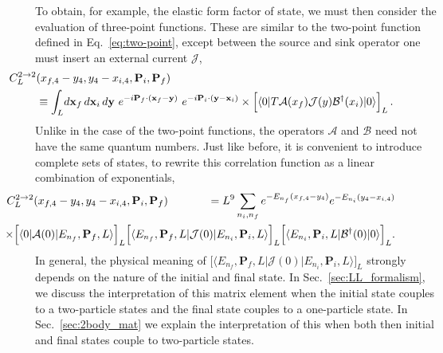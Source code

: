 \documentclass{iopart}
\theoremstyle{definition}
\newcommand{\nn}{\nonumber}
\begin{document}
{To obtain, for example, the elastic form factor of state, we must then consider the evaluation of three-point functions. These are similar to the two-point function defined in Eq.~\ref{eq:two-point}, except between the source and sink operator one must insert an external current $\mathcal{J}$, 
\begin{eqnarray}
\hspace{-2.2cm}
C_L^{2\rightarrow 2}(x_{f,4}-y_{4},y_{4}-x_{i,4}, \mathbf P_i, \mathbf P_f) &&\nn\\
&&\hspace{-4.5cm}\equiv \int_L \! d \mathbf x_f~ \! d \mathbf x_i ~ \! d \mathbf y
 \ e^{- i \mathbf  P_f \cdot (\mathbf x_f - \mathbf y)} 
  \ e^{- i \mathbf  P_i \cdot (\mathbf y - \mathbf x_i)} 
  \times  \Big [ \langle 0 \vert T 
  \mathcal A(x_f) 
  {\mathcal{J}}(y)\mathcal B^\dagger(x_i) \vert 0 \rangle \Big ]_L \,.   \label{eq:three-point_func}
  \end{eqnarray}
 Unlike in the case of the two-point functions, the operators $  \mathcal A$ and $\mathcal B$ need not have the same quantum numbers. Just like before, it is convenient to introduce complete sets of states, to rewrite this correlation function as a linear combination of exponentials,
\begin{eqnarray}
\hspace{-2.2cm}
C_L^{2\rightarrow 2}(x_{f,4}-y_4,y_4-x_{i,4}, \mathbf P_i, \mathbf P_f) &&
=  L^9 \sum_{n_i,n_f} 
  e^{- E_{n_f}(x_{f,4}-y_4)}
  e^{- E_{n_i}(y_4-x_{i,4})}\nn\\
 &&\hspace{-5.5cm}
 \times
\Big [ \langle 0 \vert  \mathcal A(0)  \vert E_{n_f}, \mathbf P_f, L \rangle \Big ]_L 
\Big [ \langle E_{n_f}, \mathbf P_f, L \vert  \mathcal J(0)  \vert E_{n_i}, \mathbf P_i, L \rangle \Big ]_L 
\Big [ \langle E_{n_i}, \mathbf P_i, L \vert \mathcal B^\dagger(0) \vert 0 \rangle \Big ]_L.
\label{eq:3pt_completeset}
\end{eqnarray}
In general, the physical meaning of $\Big [ \langle E_{n_f}, \mathbf P_f, L \vert  \mathcal J(0)  \vert E_{n_i}, \mathbf P_i, L \rangle \Big ]_L$ strongly depends on the nature of the initial and final state. In Sec.~\ref{sec:LL_formalism}, we discuss the interpretation of this matrix element when the initial state couples to a two-particle states and the final state couples to a one-particle state. In Sec.~\ref{sec:2body_mat} we explain the interpretation of this when both then initial and final states couple to two-particle states. 

}
\end{document}
